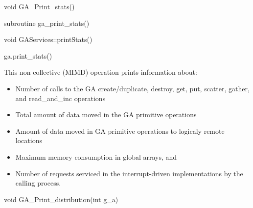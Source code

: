 \documentclass[10pt]{article}
\begin{document}

\begin{capi}
\begin{ccode}
void GA_Print_stats()
\end{ccode}
\end{capi}

\begin{fapi}
\begin{fcode}
subroutine ga_print_stats()
\end{fcode}
\end{fapi}

\begin{cxxapi}
\begin{cxxcode}
void GAServices::printStats()
\end{cxxcode}
\end{cxxapi}

\begin{pyapi}
\begin{pycode}
ga.print_stats()
\end{pycode}
\end{pyapi}

\local

\begin{desc}

This non-collective (MIMD) operation prints information about:
\begin{itemize}
    \item Number of calls to the GA create/duplicate, destroy, get, put,
    scatter, gather, and read_and_inc operations
    \item Total amount of data moved in the GA primitive operations
    \item Amount of data moved in GA primitive operations to logicaly remote
    locations
    \item Maximum memory consumption in global arrays, and
    \item Number of requests serviced in the interrupt-driven implementations
    by the calling process.
\end{itemize}

\end{desc}


\begin{capi}
\begin{ccode}
void GA_Print_distribution(int g_a)
\end{ccode}
\begin{funcargs}
\end{funcargs}
\end{capi}
\end{document}
